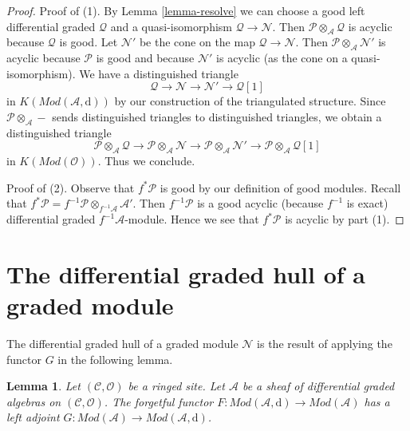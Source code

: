 \documentclass{stacks-project}
\theoremstyle{plain}
\newtheorem{lemma}[subsection]{Lemma}
\theoremstyle{definition}
\theoremstyle{remark}
\numberwithin{equation}{subsection}
\begin{document}
\begin{proof}
Proof of (1). By Lemma \ref{lemma-resolve} we can choose a good
left differential graded $\mathcal{Q}$ and a quasi-isomorphism
$\mathcal{Q} \to \mathcal{N}$. Then
$\mathcal{P} \otimes_\mathcal{A} \mathcal{Q}$
is acyclic because $\mathcal{Q}$ is good.
Let $\mathcal{N}'$ be the cone on the map
$\mathcal{Q} \to \mathcal{N}$. Then
$\mathcal{P} \otimes_\mathcal{A} \mathcal{N}'$ is acyclic because
$\mathcal{P}$ is good and because $\mathcal{N}'$ is acyclic
(as the cone on a quasi-isomorphism). We have a distinguished
triangle
$$
\mathcal{Q} \to \mathcal{N} \to \mathcal{N}' \to \mathcal{Q}[1]
$$
in $K(\textit{Mod}(\mathcal{A}, \text{d}))$ by our construction
of the triangulated structure. Since
$\mathcal{P} \otimes_\mathcal{A} -$ sends distinguished
triangles to distinguished triangles, we obtain a distinguished
triangle
$$
\mathcal{P} \otimes_\mathcal{A} \mathcal{Q} \to
\mathcal{P} \otimes_\mathcal{A} \mathcal{N} \to
\mathcal{P} \otimes_\mathcal{A} \mathcal{N}' \to
\mathcal{P} \otimes_\mathcal{A} \mathcal{Q}[1]
$$
in $K(\textit{Mod}(\mathcal{O}))$. Thus we conclude.

\medskip\noindent
Proof of (2). Observe that $f^*\mathcal{P}$ is good by our definition
of good modules. Recall that
$f^*\mathcal{P} = f^{-1}\mathcal{P} \otimes_{f^{-1}\mathcal{A}} \mathcal{A}'$.
Then $f^{-1}\mathcal{P}$ is a good acyclic (because $f^{-1}$ is exact)
differential graded $f^{-1}\mathcal{A}$-module. Hence
we see that $f^*\mathcal{P}$ is acyclic by part (1).
\end{proof}






\section{The differential graded hull of a graded module}
\label{section-dg-hull}

\noindent
The differential graded hull of a graded module $\mathcal{N}$ is
the result of applying the functor $G$ in the following lemma.

\begin{lemma}
\label{lemma-dg-hull}
Let $(\mathcal{C}, \mathcal{O})$ be a ringed site.
Let $\mathcal{A}$ be a sheaf of differential graded algebras
on $(\mathcal{C}, \mathcal{O})$. The forgetful functor
$F : \textit{Mod}(\mathcal{A}, \text{d}) \to \textit{Mod}(\mathcal{A})$
has a left adjoint $G : \textit{Mod}(\mathcal{A}) \to
\textit{Mod}(\mathcal{A}, \text{d})$.
\end{lemma}
\end{document}
